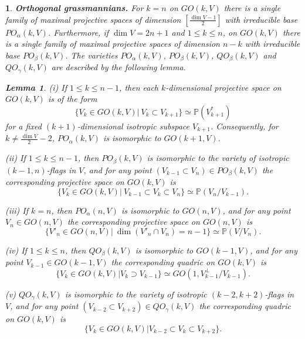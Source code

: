 \documentclass[12pt]{amsart}
\newtheorem{lemma}[theorem]{Lemma}
\newtheorem{sub}[subsection]{}
\theoremstyle{definition}
\begin{document}
\begin{sub}{\bf Orthogonal grassmannians.}
For $k=n$ on $GO(k,V)$ there is a single family of maximal projective spaces of
dimension $[\frac{\dim V-1}{2}]$ with irreducible base $PO_{\alpha}(k,V)$. Furthermore, if $\dim V=2n+1$ and
$1\le k\le n$, on $GO(k,V)$ there is a single family of maximal projective spaces of dimension $n-k$ with irreducible
base $PO_{\beta}(k,V)$.
The varieties $PO_{\alpha}(k,V)$, $PO_{\beta}(k,V)$, $QO_{\beta}(k,V)$ and $QO_{\gamma}(k,V)$ are described by
the following lemma.

\begin{lemma}\label{Bkn}
(i) If $1\le k\le n-1$, then each $k$-dimensional projective space on $GO(k,V)$ is of the form
\begin{equation}\label{PkI}
\{V_k\in GO(k,V)|\ V_k\subset V_{k+1}\}\simeq\mathbb{P}(V_{k+1}^*)
\end{equation}
for a fixed $(k+1)$-dimensional isotropic subspace $V_{k+1}$. Consequently, for $k\ne\frac{\dim V}{2}-2$,
$PO_{\alpha}(k,V)$ is isomorphic to $GO(k+1,V)$.

(ii) If $1\le k\le n-1$, then $PO_{\beta}(k,V)$ is isomorphic to the variety of isotropic $(k-1,n)$-flags in $V$,
and for any point $(V_{k-1}\subset V_n)\in PO_{\beta}(k,V)$ the corresponding projective space on $GO(k,V)$ is
\begin{equation}\label{Pn-k}
\{V_k\in GO(k,V)|\ V_{k-1}\subset V_k\subset V_n\}\simeq\mathbb{P}(V_n/V_{k-1}).
\end{equation}

(iii) If $k=n$, then $PO_{\alpha}(n,V)$ is isomorphic to $GO(n,V)$,
and for any point $V_n\in GO(n,V)$ the corresponding projective space on $GO(n,V)$ is
\begin{equation}\label{PnI}
\{V'_n\in GO(n,V)|\ \dim(V'_n\cap V_n)=n-1\}\simeq\mathbb{P}(V/V_n).
\end{equation}

(iv) If $1\le k\le n$, then $QO_{\beta}(k,V)$ is isomorphic to $GO(k-1,V)$, and for any point
$V_{k-1}\in GO(k-1,V)$ the corresponding quadric on $GO(k,V)$ is
\begin{equation}\label{Q}
\{V_k\in GO(k,V)|V_k\supset V_{k-1}\}\simeq GO(1,V_{k-1}^\bot/V_{k-1}).
\end{equation}

(v) $QO_{\gamma}(k,V)$ is isomorphic to the variety of isotropic $(k-2,k+2)$-flags in $V$, and for any point
$(V_{k-2}\subset V_{k+2})\in QO_{\gamma}(k,V)$ the corresponding quadric on $GO(k,V)$ is
\begin{equation}\label{Q1}
\{V_k\in GO(k,V)|V_{k-2}\subset V_k\subset V_{k+2}\}.
\end{equation}


\end{lemma}
\end{sub}
\end{document}
